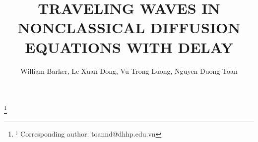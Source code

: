 \documentclass[12pt,letterpaper]{amsart}
\theoremstyle{definition}
\theoremstyle{remark}
\numberwithin{equation}{section}
\begin{document}
\title[TRAVELING WAVES IN NONCLASSICAL DIFFUSION EQUATIONS WITH
  DELAY]
{TRAVELING WAVES IN NONCLASSICAL DIFFUSION EQUATIONS WITH
 DELAY}
















\author  [W. Barker, L.X. Dong$^{\natural}$, V. T. Luong, N.D. Toan] {William Barker, Le Xuan Dong, Vu Trong Luong, Nguyen Duong Toan}




 
\address{William Barker 
 \hfill\break 
 Department of Mathematics and Statistics, University of Arkansas at Little Rock,  2801
 S University Ave, Little Rock, AR 72204. USA.}
 
\address{Le Xuan Dong
	\hfill\break 
	Faculty of Basic Science, Viet Tri University of Industry,  9 Tien Son, Tien Cat, Viet Tri, Phu Tho, Viet Nam}




\address{Vu Trong Luong
	\hfill\break 
	VNU-University of Education, Hanoi 144 Xuan Thuy, Cau Giay, Hanoi, Vietnam
	Vietnam National University}








\address{Nguyen Duong Toan \hfill\break
Department of Mathematics, Haiphong University\hfill{} Phan Dang Luu, Kien An, Haiphong, Vietnam}








































\thanks{$^{\natural}$ Corresponding author: toannd@dhhp.edu.vn}
\end{document}
